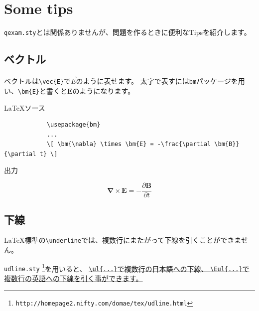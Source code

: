 \documentclass[dvipdfmx,a4j,11pt]{jarticle}
\newenvironment{inputbox}{%
	\begin{itembox}[r]{\LaTeX ソース}
}{
	\end{itembox}
}
\newenvironment{outputbox}{%
	\begin{itembox}[r]{出力}
}{%
	\end{itembox}
}
\begin{document}
\clearpage
\section{Some tips}
	{\tt qexam.sty}とは関係ありませんが、問題を作るときに便利なTipsを紹介します。

\subsection{ベクトル}
	ベクトルは{\tt \verb"\vec{E}"}で$\vec{E}$のように表せます。
	太字で表すには{\tt bm}パッケージを用い、{\tt \verb"\bm{E}"}と書くと$\bm{E}$のようになります。
	\begin{inputbox}
		\begin{verbatim}
			\usepackage{bm}
			...
			\[ \bm{\nabla} \times \bm{E} = -\frac{\partial \bm{B}}{\partial t} \]
		\end{verbatim}
	\end{inputbox}
	
	\begin{outputbox}
				\[ \bm{\nabla} \times \bm{E} = -\frac{\partial \bm{B}}{\partial t} \]
	\end{outputbox}
	
\subsection{下線}
	\LaTeX 標準の{\tt \textbackslash underline}では、複数行にまたがって下線を引くことができません。
	
	{\tt udline.sty} 
	\footnote{{\tt http://homepage2.nifty.com/domae/tex/udline.html}}を用いると、
	\ul{{\tt \textbackslash ul\{...\}}で複数行の日本語への下線、
	{\tt \textbackslash Eul\{...\}}で複数行の英語への下線を引く事ができます。}
	
\end{document}
